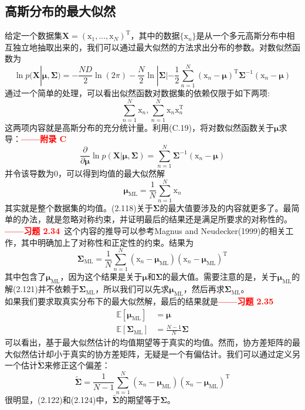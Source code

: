 \documentclass[b5paper]{book}
\numberwithin{equation}{chapter}
\newcommand {\bx} {\boldsymbol{\mathrm{x}}}
\newcommand {\rmT} {\mathrm{T}}
\newcommand {\bfMu} {\boldsymbol{\mu}}
\newcommand {\bfSigma} {\boldsymbol{\Sigma}}
\begin{document}
	\subsection{高斯分布的最大似然}
	\textnormal{
	给定一个数据集$\mathbf{X}=(\bx_1,...,\bx_N)^{\rmT}$，其中的数据$\{\bx_n\}$是从一个多元高斯分布中相互独立地抽取出来的，我们可以通过最大似然的方法求出分布的参数。对数似然函数为
	\begin{equation}
		\ln p(\mathbf{X}|\bfMu,\bfSigma)=-\frac{ND}{2}\ln (2\pi) -\frac{N}{2}\ln |\bfSigma| -\frac{1}{2}\sum_{n=1}^N(\bx_n-\bfMu)^{\rmT}\bfSigma^{-1}(\bx_n-\bfMu)
	\end{equation}
	通过一个简单的处理，可以看出似然函数对数据集的依赖仅限于如下两项:
	\begin{equation}
		\sum_{n=1}^N\bx_n , \sum_{n=1}^N\bx_n\bx_n^{\rmT}
	\end{equation}
	这两项内容就是高斯分布的充分统计量。利用(C.19)，将对数似然函数关于$\bfMu$求导：\textcolor{red}{\textbf{——附录 C}}
	\begin{equation}
		\frac{\partial}{\partial \bfMu}\ln p(\mathbf{X}|\bfMu,\bfSigma)=\sum_{n=1}^N\bfSigma^{-1}(\bx_n-\bfMu)
	\end{equation}
	并令该导数为0，可以得到均值的最大似然解
	\begin{equation}
		\bfMu_{\mathrm{ML}}=\frac{1}{N}\sum_{n=1}^N\bx_n
	\end{equation}
	其实就是整个数据集的均值。(2.118)关于$\bfSigma$的最大值要涉及的内容就更多了。最简单的办法，就是忽略对称约束，并证明最后的结果还是满足所要求的对称性的。\textcolor{red}{\textbf{——习题 2.34}\ }这个内容的推导可以参考Magnus and Neudecker(1999)的相关工作，其中明确加上了对称性和正定性的约束。结果为
	\begin{equation}
		\bfSigma_{\mathrm{ML}} = \frac{1}{N}\sum_{n=1}^N(\bx_n-\bfMu_{\mathrm{ML}})(\bx_n-\bfMu_{\mathrm{ML}})^{\rmT}
	\end{equation}
	其中包含了$\bfMu_{\mathrm{ML}}$，因为这个结果是关于$\bfMu$和$\bfSigma$的最大值。需要注意的是，关于$\bfMu_{\mathrm{ML}}$的解(2.121)并不依赖于$\bfSigma_{\mathrm{ML}}$，所以我们可以先求$\bfMu_{\mathrm{ML}}$，然后再求$\bfSigma_{\mathrm{ML}}$。\\
	\indent 如果我们要求取真实分布下的最大似然解，最后的结果就是\textcolor{red}{\textbf{——习题 2.35}}
	\begin{align}
		\mathbb{E}[\bfMu_{\mathrm{ML}}] &= \bfMu\\
		\mathbb{E}[\bfSigma_{\mathrm{ML}}] &=\frac{N-1}{N}\bfSigma
	\end{align}
	可以看出，基于最大似然估计的均值期望等于真实的均值。然而，协方差矩阵的最大似然估计却小于真实的协方差矩阵，无疑是一个有偏估计。我们可以通过定义另一个估计$\widetilde{\bfSigma}$来修正这个偏差：
	\begin{equation}
		\widetilde{\bfSigma}=\frac{1}{N-1}\sum_{n=1}^N(\bx_n-\bfMu_{\mathrm{ML}})(\bx_n-\bfMu_{\mathrm{ML}})^{\rmT}
	\end{equation}
	很明显，(2.122)和(2.124)中，$\widetilde{\bfSigma}$的期望等于$\bfSigma$。
	}
\end{document}
